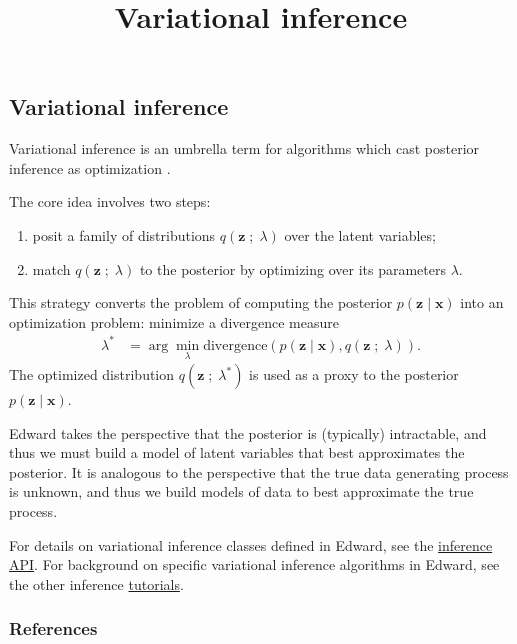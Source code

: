 \title{Variational inference}

\subsection{Variational inference}

Variational inference is an umbrella term for algorithms which cast
posterior inference as optimization
\citep{hinton1993keeping,waterhouse1996bayesian,jordan1999introduction}.

The core idea involves two steps:
\begin{enumerate}
   \item posit a family of distributions $q(\mathbf{z}\;;\;\lambda)$
   over the latent variables;
   \item match $q(\mathbf{z}\;;\;\lambda)$ to the posterior by
   optimizing over its parameters $\lambda$.
 \end{enumerate}
This strategy converts the problem of computing the posterior
$p(\mathbf{z} \mid \mathbf{x})$ into an optimization problem:
minimize a divergence measure
\begin{align*}
  \lambda^*
  &=
  \arg\min_\lambda \text{divergence}(
  p(\mathbf{z} \mid \mathbf{x})
  ,
  q(\mathbf{z}\;;\;\lambda)
  ).
\end{align*}
The optimized distribution $q(\mathbf{z}\;;\;\lambda^*)$ is used as
a proxy to the posterior $p(\mathbf{z}\mid \mathbf{x})$.

Edward takes the perspective that the posterior is (typically)
intractable, and thus we must build a model of latent variables that
best approximates the posterior.
It is analogous to the perspective
that the true data generating process is unknown, and thus we build
models of data to best approximate the true process.

For details on variational inference classes defined in Edward,
see the \href{/api/inference}{inference API}.
For background on specific variational inference algorithms in
Edward, see the other inference \href{/tutorials/}{tutorials}.

\subsubsection{References}\label{references}

